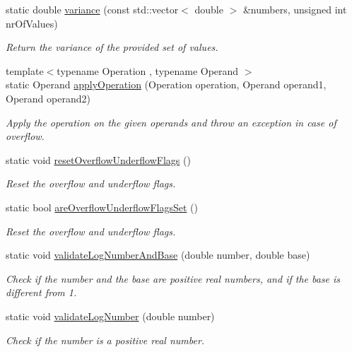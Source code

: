 \begin{DoxyCompactItemize}
static double \hyperlink{classmultiscale_1_1Numeric_aabe74259c165a5f07a209c82699729e2}{variance} (const std\-::vector$<$ double $>$ \&numbers, unsigned int nr\-Of\-Values)
\begin{DoxyCompactList}\small\item\em \-Return the variance of the provided set of values. \end{DoxyCompactList}\item 
{\footnotesize template$<$typename Operation , typename Operand $>$ }\\static \-Operand \hyperlink{classmultiscale_1_1Numeric_a6fe5731e0a4b2728bd4827b564102eb3}{apply\-Operation} (\-Operation operation, \-Operand operand1, \-Operand operand2)
\begin{DoxyCompactList}\small\item\em \-Apply the operation on the given operands and throw an exception in case of overflow. \end{DoxyCompactList}\item 
static void \hyperlink{classmultiscale_1_1Numeric_a5b2a0b5b4aaf837d3d6cc8c3d41d445b}{reset\-Overflow\-Underflow\-Flags} ()
\begin{DoxyCompactList}\small\item\em \-Reset the overflow and underflow flags. \end{DoxyCompactList}\item 
static bool \hyperlink{classmultiscale_1_1Numeric_a096d5367722cb8571ece2bfdb800cea5}{are\-Overflow\-Underflow\-Flags\-Set} ()
\begin{DoxyCompactList}\small\item\em \-Reset the overflow and underflow flags. \end{DoxyCompactList}\item 
static void \hyperlink{classmultiscale_1_1Numeric_a552ccfdcef70918e416191eecaa94481}{validate\-Log\-Number\-And\-Base} (double number, double base)
\begin{DoxyCompactList}\small\item\em \-Check if the number and the base are positive real numbers, and if the base is different from 1. \end{DoxyCompactList}\item 
static void \hyperlink{classmultiscale_1_1Numeric_a284b70a2cd738a3f37a45439aeb0934c}{validate\-Log\-Number} (double number)
\begin{DoxyCompactList}\small\item\em \-Check if the number is a positive real number. \end{DoxyCompactList}\item 

\end{DoxyCompactItemize}
